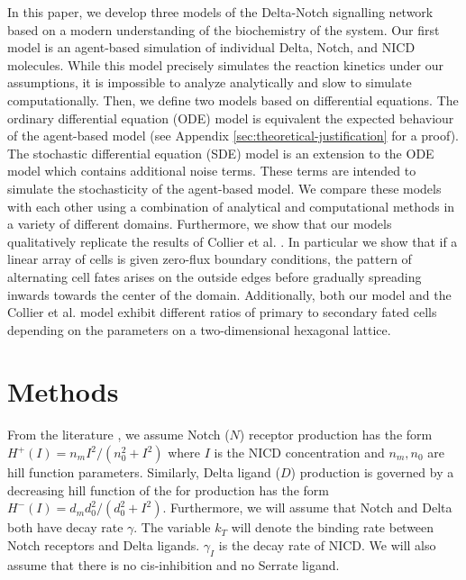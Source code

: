 \documentclass{article}
\begin{document}
\begin{flushleft}
In this paper, we develop three models of the Delta-Notch signalling network based on a modern understanding of the biochemistry of the system. 
Our first model is an agent-based simulation of individual Delta, Notch, and NICD molecules. 
While this model precisely simulates the reaction kinetics under our assumptions, it is impossible to analyze analytically and slow to simulate computationally.
Then, we define two models based on differential equations. 
The ordinary differential equation (ODE) model is equivalent the expected behaviour of the agent-based model (see Appendix \ref{sec:theoretical-justification} for a proof).
The stochastic differential equation (SDE) model is an extension to the ODE model which contains additional noise terms.
These terms are intended to simulate the stochasticity of the agent-based model.
We compare these models with each other using a combination of analytical and computational methods in a variety of different domains.
Furthermore, we show that our models qualitatively replicate the results of Collier et al. \cite{collier_pattern_1996}. 
In particular we show that if a linear array of cells is given zero-flux boundary conditions, the pattern of alternating cell fates arises on the outside edges before gradually spreading inwards towards the center of the domain.
Additionally, both our model and the Collier et al. model exhibit different ratios of primary to secondary fated cells depending on the parameters on a two-dimensional hexagonal lattice. 

\section*{Methods}

From the literature \cite{collier_pattern_1996, boareto_jaggeddelta_2015}, we assume Notch ($N$) receptor production has the form $H^{+}(I) = n_{m}I^2/(n_{0}^2 + I^2)$ where $I$ is the NICD concentration and $n_{m}, n_{0}$ are hill function parameters.
Similarly, Delta ligand ($D$) production is governed by a decreasing hill function of the for production has the form $H^{-}(I) = d_{m}d_{0}^2/(d_{0}^2 + I^2)$.
Furthermore, we will assume that Notch and Delta both have decay rate $\gamma$.
The variable $k_{T}$ will denote the binding rate between Notch receptors and Delta ligands.
$\gamma_{I}$ is the decay rate of NICD.
We will also assume that there is no cis-inhibition and no Serrate ligand. 


\end{flushleft}
\end{document}
